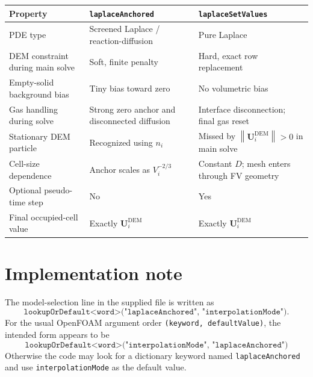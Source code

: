 \documentclass[11pt,a4paper]{article}
\newcommand{\Ud}{\bm{U}^{\mathrm{DEM}}}
\newcommand{\norm}[1]{\left\lVert #1\right\rVert}
\begin{document}
\begin{center}
\begin{tabularx}{0.96\textwidth}{L{4.5cm}YY}
\toprule
Property & \texttt{laplaceAnchored} & \texttt{laplaceSetValues}\\
\midrule
PDE type & Screened Laplace / reaction-diffusion & Pure Laplace\\
DEM constraint during main solve & Soft, finite penalty & Hard, exact row replacement\\
Empty-solid background bias & Tiny bias toward zero & No volumetric bias\\
Gas handling during solve & Strong zero anchor and disconnected diffusion & Interface disconnection; final gas reset\\
Stationary DEM particle & Recognized using $n_i$ & Missed by $\norm{\Ud_i}>0$ in main solve\\
Cell-size dependence & Anchor scales as $V_i^{-2/3}$ & Constant $D$; mesh enters through FV geometry\\
Optional pseudo-time step & No & Yes\\
Final occupied-cell value & Exactly $\Ud_i$ & Exactly $\Ud_i$\\
\bottomrule
\end{tabularx}
\end{center}

\section{Implementation note}

The model-selection line in the supplied file is written as
\[
\texttt{lookupOrDefault<word>("laplaceAnchored", "interpolationMode")}.
\]
For the usual OpenFOAM argument order \texttt{(keyword, defaultValue)}, the intended
form appears to be
\[
\boxed{
\texttt{lookupOrDefault<word>("interpolationMode", "laplaceAnchored")}
}
\]
Otherwise the code may look for a dictionary keyword named
\texttt{laplaceAnchored} and use \texttt{interpolationMode} as the default value.
\end{document}
